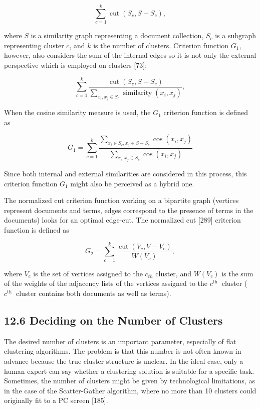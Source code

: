 \documentclass[10pt]{book}
\begin{document}
\begin{equation*}
\sum_{c=1}^{k} \operatorname{cut}\left(S_{c}, S-S_{c}\right), \tag{12.20}
\end{equation*}


where $S$ is a similarity graph representing a document collection, $S_{c}$ is a subgraph representing cluster $c$, and $k$ is the number of clusters. Criterion function $G_{1}$, however, also considers the sum of the internal edges so it is not only the external perspective which is employed on clusters [73]:


\begin{equation*}
\sum_{c=1}^{k} \frac{\operatorname{cut}\left(S_{c}, S-S_{c}\right)}{\sum_{x_{i}, x_{j} \in S_{c}} \operatorname{similarity}\left(x_{i}, x_{j}\right)}, \tag{12.21}
\end{equation*}


When the cosine similarity measure is used, the $G_{1}$ criterion function is defined as


\begin{equation*}
G_{1}=\sum_{c=1}^{k} \frac{\sum_{x_{i} \in S_{c}, x_{j} \in S-S_{c}} \cos \left(x_{i}, x_{j}\right)}{\sum_{x_{i}, x_{j} \in S_{c}} \cos \left(x_{i}, x_{j}\right)} \tag{12.22}
\end{equation*}


Since both internal and external similarities are considered in this process, this criterion function $G_{1}$ might also be perceived as a hybrid one.

The normalized cut criterion function working on a bipartite graph (vertices represent documents and terms, edges correspond to the presence of terms in the documents) looks for an optimal edge-cut. The normalized cut [289] criterion function is defined as


\begin{equation*}
G_{2}=\sum_{c=1}^{k} \frac{\operatorname{cut}\left(V_{c}, V-V_{c}\right)}{W\left(V_{c}\right)}, \tag{12.23}
\end{equation*}


where $V_{c}$ is the set of vertices assigned to the $c_{t h}$ cluster, and $W\left(V_{c}\right)$ is the sum of the weights of the adjacency lists of the vertices assigned to the $c^{\text {th }}$ cluster ( $c^{\text {th }}$ cluster contains both documents as well as terms).

\subsection*{12.6 Deciding on the Number of Clusters}
The desired number of clusters is an important parameter, especially of flat clustering algorithms. The problem is that this number is not often known in advance because the true cluster structure is unclear. In the ideal case, only a human expert can say whether a clustering solution is suitable for a specific task. Sometimes, the number of clusters might be given by technological limitations, as in the case of the Scatter-Gather algorithm, where no more than 10 clusters could originally fit to a PC screen [185].
\end{document}
